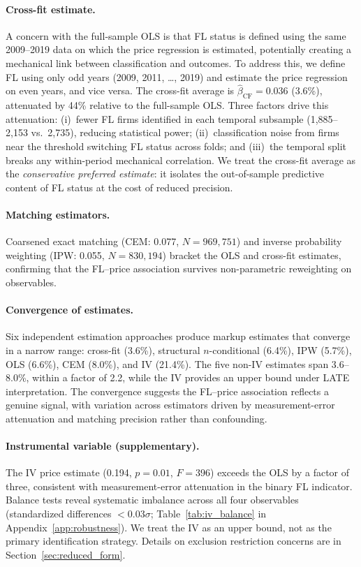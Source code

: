 \paragraph{Cross-fit estimate.} %
A concern with the full-sample OLS is that FL status is defined using
the same 2009--2019 data on which the price regression is estimated,
potentially creating a mechanical link between classification and
outcomes. To address this, we define FL using only odd years
(2009, 2011, \ldots, 2019) and estimate the price regression on even
years, and vice versa. The cross-fit average is $\hat{\beta}_{\text{CF}}
= 0.036$ (3.6\%), attenuated by 44\% relative to the full-sample OLS.
Three factors drive this attenuation: (i)~fewer FL firms identified in
each temporal subsample (1,885--2,153 vs.\ 2,735), reducing
statistical power; (ii)~classification noise from firms near the
threshold switching FL status across folds; and (iii)~the temporal
split breaks any within-period mechanical correlation. We treat the
cross-fit average as the \emph{conservative preferred estimate}: it
isolates the out-of-sample predictive content of FL status at the cost
of reduced precision.

\paragraph{Matching estimators.} %
Coarsened exact matching (CEM: 0.077, $N = 969{,}751$) and inverse
probability weighting (IPW: 0.055, $N = 830{,}194$) bracket the OLS
and cross-fit estimates, confirming that the FL--price association
survives non-parametric reweighting on observables.

\paragraph{Convergence of estimates.}
Six independent estimation approaches produce markup estimates that
converge in a narrow range: cross-fit (3.6\%), structural
$n$-conditional (6.4\%), IPW (5.7\%), OLS (6.6\%), CEM (8.0\%),
and IV (21.4\%). The five non-IV estimates span 3.6--8.0\%, within a
factor of 2.2, while the IV provides an upper bound under LATE
interpretation. The convergence suggests the FL--price association
reflects a genuine signal, with variation across estimators driven by
measurement-error attenuation and matching precision rather than
confounding.

\paragraph{Instrumental variable (supplementary).} %
The IV price estimate (0.194, $p = 0.01$, $F = 396$) exceeds the OLS
by a factor of three, consistent with measurement-error attenuation
in the binary FL indicator. Balance tests reveal systematic
imbalance across all four observables (standardized differences
$< 0.03\sigma$; Table~\ref{tab:iv_balance} in
Appendix~\ref{app:robustness}). We treat the IV as an upper bound,
not as the primary identification strategy. Details on exclusion
restriction concerns are in Section~\ref{sec:reduced_form}.

